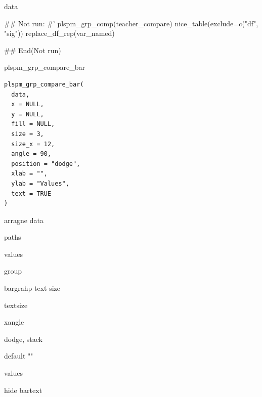 \documentclass[a4paper]{book}
\begin{document}
%
\begin{Value}
data
\end{Value}
%
\begin{Examples}
\begin{ExampleCode}

\#\# Not run: 
#'
plspm_grp_comp(teacher_compare) %
  nice_table(exclude=c("df", "sig"))%
  replace_df_rep(var_named) %

## End(Not run)

\end{ExampleCode}
\end{Examples}
%
\begin{Description}
plspm\_grp\_compare\_bar
\end{Description}
%
\begin{Usage}
\begin{verbatim}
plspm_grp_compare_bar(
  data,
  x = NULL,
  y = NULL,
  fill = NULL,
  size = 3,
  size_x = 12,
  angle = 90,
  position = "dodge",
  xlab = "",
  ylab = "Values",
  text = TRUE
)
\end{verbatim}
\end{Usage}
%
\begin{Arguments}
\begin{ldescription}
\item[\code{data}] arragne data

\item[\code{x}] paths

\item[\code{y}] values

\item[\code{fill}] group

\item[\code{size}] bargrahp text size

\item[\code{size\_x}] textsize

\item[\code{angle}] xangle

\item[\code{position}] dodge, stack

\item[\code{xlab}] default ""

\item[\code{ylab}] values

\item[\code{text}] hide bartext
\end{ldescription}
\end{Arguments}
\end{document}
